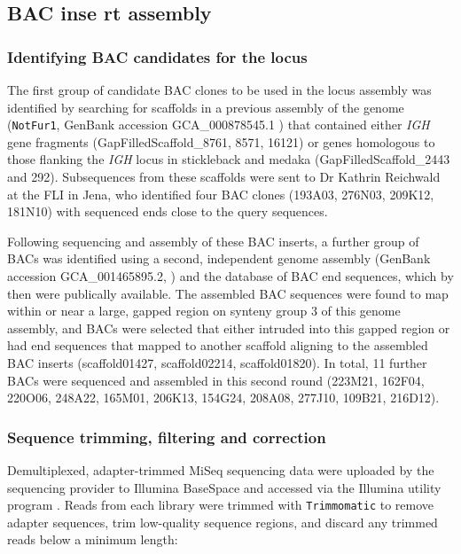\subsection{BAC inse
rt assembly}
\label{sec:methods_comp_bacs}

\subsubsection{Identifying BAC candidates for the \nfu \igh{} locus}
\label{sec:methods_comp_bacs_ident}

The first group of candidate BAC clones \parencite{reichwald2015genome} to be used in the \Nfu locus assembly was identified by searching for scaffolds in a previous assembly of the \Nfu genome (\texttt{NotFur1}, GenBank accession GCA\_000878545.1 \parencite{valenzano2015genome}) that contained either \textit{IGH} gene fragments (GapFilledScaffold\_8761, 8571, 16121) or genes homologous to those flanking the \textit{IGH} locus in stickleback and medaka (GapFilledScaffold\_2443 and 292). Subsequences from these scaffolds were sent to Dr Kathrin Reichwald at the FLI in Jena, who identified four BAC clones (193A03, 276N03, 209K12, 181N10) with sequenced ends close to the query sequences.

Following sequencing and assembly of these BAC inserts, a further group of BACs was identified using a second, independent genome assembly (GenBank accession 	GCA\_001465895.2, \parencite{reichwald2015genome}) and the database of BAC end sequences, which by then were publically available. The assembled BAC sequences were found to map within or near a large, gapped region on synteny group 3 of this genome assembly, and BACs were selected that either intruded into this gapped region or had end sequences that mapped to another scaffold aligning to the assembled BAC inserts (scaffold01427, scaffold02214, scaffold01820). In total, 11 further BACs were sequenced and assembled in this second round (223M21, 162F04, 220O06, 248A22, 165M01, 206K13, 154G24, 208A08, 277J10, 109B21, 216D12).

\subsubsection{Sequence trimming, filtering and correction}
\label{sec:methods_comp_bacs_trim}

Demultiplexed, adapter-trimmed MiSeq sequencing data were uploaded by the sequencing provider to Illumina BaseSpace and accessed via the Illumina utility program . Reads from each library were trimmed with \lstinline{Trimmomatic} \parencite{bolger2014trimmomatic} to remove adapter sequences, trim low-quality sequence regions, and discard any trimmed reads below a minimum length:

